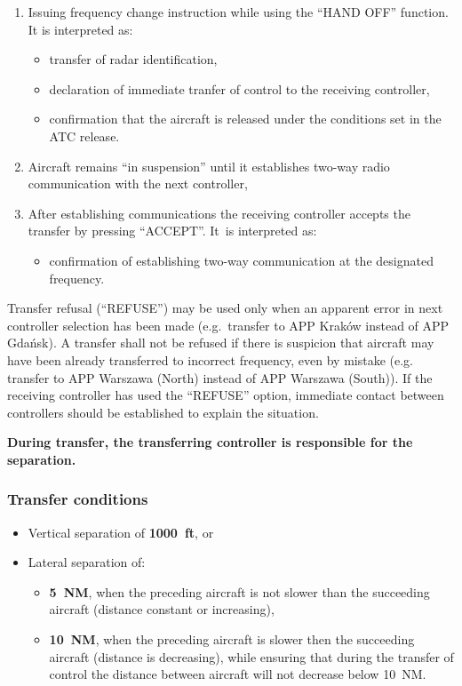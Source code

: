 \begin{enumerate}
\item Issuing frequency change instruction while using the ``HAND OFF''
  function. It is interpreted as:
  \begin{itemize}
  \item transfer of radar identification,
  \item declaration of immediate tranfer of control to the receiving controller,
  \item confirmation that the aircraft is released under the conditions set in
    the ATC release.
  \end{itemize}
\item Aircraft remains ``in suspension'' until it establishes two-way radio
  communication with the next controller,
\item After establishing communications the receiving controller accepts the
  transfer by pressing ``ACCEPT''. It~is interpreted as:
  \begin{itemize}
  \item confirmation of establishing two-way communication at the designated frequency.
  \end{itemize}
\end{enumerate}

Transfer refusal (``REFUSE'') may be used only when an apparent error in next
controller selection has been made (e.g.\ transfer to APP Kraków instead of APP
Gdańsk). A transfer shall not be refused if there is suspicion that aircraft may
have been already transferred to incorrect frequency, even by mistake (e.g.
transfer to APP Warszawa (North) instead of APP Warszawa (South)). If the
receiving controller has used the ``REFUSE'' option, immediate contact between
controllers should be established to explain the situation.

\textbf{During transfer, the transferring controller is responsible for the separation.}

\subsubsection{Transfer conditions}

\begin{itemize}
\item Vertical separation of \textbf{1000~ft}, or
\item Lateral separation of:
  \begin{itemize}
  \item \textbf{5~NM}, when the preceding aircraft is not slower than the
    succeeding aircraft (distance constant or increasing),
  \item \textbf{10~NM}, when the preceding aircraft is slower then the
    succeeding aircraft (distance is decreasing), while ensuring that during the
    transfer of control the distance between aircraft will not decrease below 10~NM.\@
  \end{itemize}
\end{itemize}

